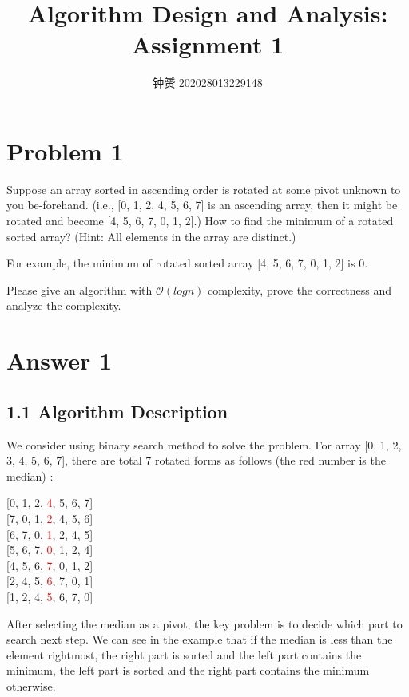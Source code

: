 \documentclass[UTF8]{ctexart}
\title{Algorithm Design and Analysis: Assignment 1}
\author{钟赟 202028013229148}
\begin{document}

\maketitle

\section*{Problem 1}
Suppose an array sorted in ascending order is rotated at some pivot unknown to you be-forehand. (i.e., [0, 1, 2, 4, 5, 6, 7] is an ascending array, then it might be rotated and become
[4, 5, 6, 7, 0, 1, 2].) How to find the minimum of a rotated sorted array?
(Hint: All elements in the array are distinct.)

For example, the minimum of rotated sorted array [4, 5, 6, 7, 0, 1, 2] is 0.

Please give an algorithm with $\mathcal{O}(log n)$ complexity, prove the correctness and analyze the complexity.
\section*{Answer 1}
\subsection*{1.1 Algorithm Description} 
We consider using binary search method to solve the problem. For array [0, 1, 2, 3, 4, 5, 6, 7], there are total 7 rotated forms as follows (the red number is the median) :
\begin{center}
	[0, 1, 2, \textcolor{red}{4}, 5, 6, 7]\\{}
	[7, 0, 1, \textcolor{red}{2}, 4, 5, 6]\\{}
	[6, 7, 0, \textcolor{red}{1}, 2, 4, 5]\\{}
	[5, 6, 7, \textcolor{red}{0}, 1, 2, 4]\\{}
	[4, 5, 6, \textcolor{red}{7}, 0, 1, 2]\\{}
	[2, 4, 5, \textcolor{red}{6}, 7, 0, 1]\\{}
	[1, 2, 4, \textcolor{red}{5}, 6, 7, 0]\\{}
\end{center}

After selecting the median as a pivot, the key problem is to decide which part to search next step. We can see in the example that if the median is less than the element rightmost, the right part is sorted and the left part contains the minimum, the left part is sorted and the right part contains the minimum otherwise. 
\end{document}
